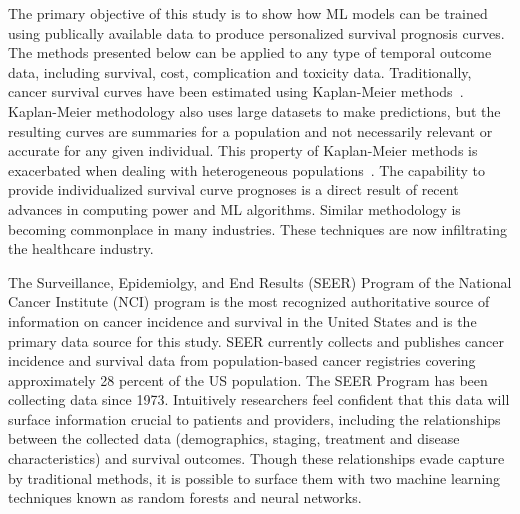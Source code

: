 \documentclass[10pt,letterpaper]{article}
\begin{document}
The primary objective of this study is to show how ML models can be trained using publically available data to produce personalized survival prognosis curves. The methods presented below can be applied to any type of temporal outcome data, including survival, cost, complication and toxicity data. Traditionally, cancer survival curves have been estimated using Kaplan-Meier methods~\cite{cam}. Kaplan-Meier methodology also uses large datasets to make predictions, but the resulting curves are summaries for a population and not necessarily relevant or accurate for any given individual. This property of Kaplan-Meier methods is exacerbated when dealing with heterogeneous populations~\cite{Kumbasar2016140}.  
The capability to provide individualized survival curve prognoses is a direct result of recent advances in computing power and ML algorithms. Similar methodology is becoming commonplace in many industries.
 These techniques are now infiltrating the healthcare industry.
 

The  Surveillance, Epidemiolgy, and End Results (SEER) Program of the National Cancer Institute (NCI) program is the most recognized authoritative source of information on cancer incidence and survival in the United States and is the primary data source for this study. SEER currently collects and publishes cancer incidence and survival data from population-based cancer registries covering approximately 28 percent of the US population.
The SEER Program  has been collecting data since 1973.
Intuitively 
researchers feel confident
 that this data will surface information crucial to patients and providers, including the relationships between the collected data (demographics, staging, treatment and disease characteristics) and survival outcomes.
Though these relationships evade capture by traditional methods, it is possible to surface them with two machine learning techniques known as random forests and neural networks.
\end{document}
